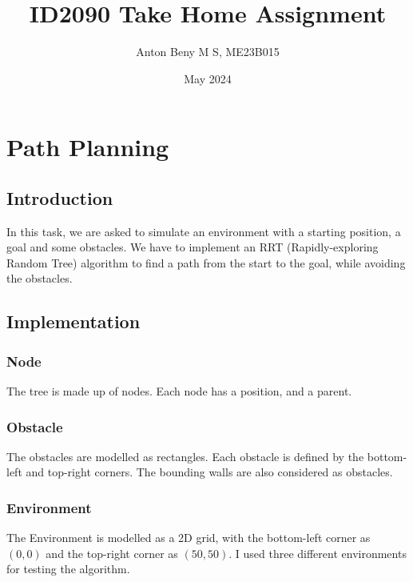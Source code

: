 \documentclass[12pt]{report}
\title{ID2090 Take Home Assignment}
\author{Anton Beny M S, ME23B015}
\date{May 2024}
\begin{document}
\maketitle
\newpage

\tableofcontents


\hypersetup{
    linkcolor=blue,
}

\newpage

\chapter{Path Planning}

\section{Introduction}
In this task, we are asked to simulate an environment with a starting position, a goal and some obstacles. We have to implement an RRT (Rapidly-exploring Random Tree) algorithm to find a path from the start to the goal, while avoiding the obstacles.

\section{Implementation}

\subsection{Node}

The tree is made up of nodes. Each node has a position, and a parent.

\subsection{Obstacle}

The obstacles are modelled as rectangles. Each obstacle is defined by the bottom-left and top-right corners. The bounding walls are also considered as obstacles.

\subsection{Environment}

The Environment is modelled as a 2D grid, with the bottom-left corner as $(0, 0)$ and the top-right corner as $(50, 50)$. I used three different environments for testing the algorithm.
\end{document}
